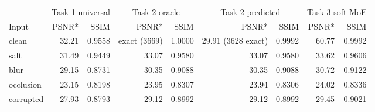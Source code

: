 \begin{tabular}{lrrrrrrrr}
\toprule
 & \multicolumn{2}{c}{Task 1 universal} & \multicolumn{2}{c}{Task 2 oracle} & \multicolumn{2}{c}{Task 2 predicted} & \multicolumn{2}{c}{Task 3 soft MoE} \\
Input & PSNR* & SSIM & PSNR* & SSIM & PSNR* & SSIM & PSNR* & SSIM \\
\midrule
clean & 32.21 & 0.9558 & exact (3669) & 1.0000 & 29.91 (3628 exact) & 0.9992 & 60.77 & 0.9992 \\
salt & 31.49 & 0.9449 & 33.07 & 0.9580 & 33.07 & 0.9580 & 33.62 & 0.9606 \\
blur & 29.15 & 0.8731 & 30.35 & 0.9088 & 30.35 & 0.9088 & 30.72 & 0.9122 \\
occlusion & 23.15 & 0.8198 & 23.95 & 0.8307 & 23.94 & 0.8306 & 24.02 & 0.8336 \\
corrupted & 27.93 & 0.8793 & 29.12 & 0.8992 & 29.12 & 0.8992 & 29.45 & 0.9021 \\
\bottomrule
\end{tabular}
